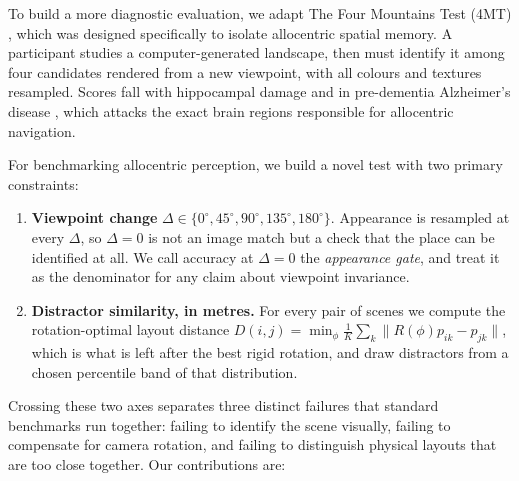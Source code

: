 \documentclass{article}
\begin{document}
To build a more diagnostic evaluation, we adapt The Four Mountains Test (4MT) \citep{hartley2007hippocampus}, which was designed specifically to isolate allocentric spatial memory. A participant studies a computer-generated landscape, then must identify it among four candidates rendered from a new viewpoint, with all colours and textures resampled. Scores fall with hippocampal damage \citep{hartley2007hippocampus,bird2010topographical} and in pre-dementia Alzheimer's disease \citep{chan2016four,wood2016allocentric}, which attacks the exact brain regions responsible for allocentric navigation. 

For benchmarking allocentric perception, we build a novel test with two primary constraints: 
\begin{enumerate}\itemsep2pt
\item \textbf{Viewpoint change} $\Delta \in \{0^\circ, 45^\circ, 90^\circ, 135^\circ, 180^\circ\}$. Appearance is resampled at every $\Delta$, so $\Delta=0$ is not an image match but a check that the place can be identified at all. We call accuracy at $\Delta=0$ the \emph{appearance gate}, and treat it as the denominator for any claim about viewpoint invariance.
\item \textbf{Distractor similarity, in metres.} For every pair of scenes we compute the rotation-optimal layout distance $D(i,j)=\min_\phi \frac{1}{K}\sum_k \lVert R(\phi)p_{ik}-p_{jk}\rVert$, which is what is left after the best rigid rotation, and draw distractors from a chosen percentile band of that distribution.
\end{enumerate}

Crossing these two axes separates three distinct failures that standard benchmarks run together: failing to identify the scene visually, failing to compensate for camera rotation, and failing to distinguish physical layouts that are too close together. Our contributions are:
\end{document}
